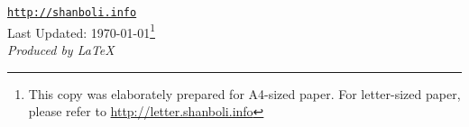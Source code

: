 \vfill
\begin{figure}[h]
\hspace{1.43in}
\end{figure}
\begin{narrow}{0.15in}{1.5in}
\begin{center}
\href{http://shanboli.info}{\tt http://shanboli.info}\\
\vspace{0.15in}
Last Updated: \today\footnote{This copy was elaborately prepared for A4-sized paper. For letter-sized paper, please refer to \href{http://letter.shanboli.info}
{http://letter.shanboli.info}}\\
\vspace{0.15in}
\textit{Produced by \LaTeX}
\end{center}
\end{narrow}
